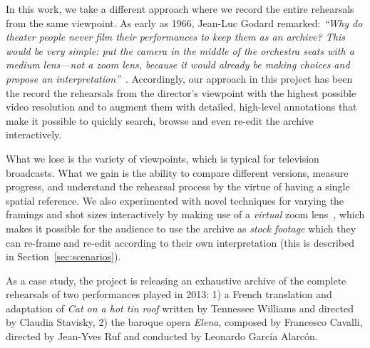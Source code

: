 \documentclass[conference]{IEEEtran}
\newcommand{\todo}[1]{\noindent\textcolor{red}{{\bf \{ToDo} #1{\bf \}}}}
\begin{document}
In this work, we take a different approach where we record the entire rehearsals from the same viewpoint.  As early as 1966, Jean-Luc Godard remarked: {\em ``Why do theater people never film their performances to keep  them as an archive? This would be very simple: put the camera in the middle of the orchestra seats with a medium lens---not a zoom lens, because it would already be making choices and propose an interpretation''}~\cite{Godard66}. Accordingly, our approach in this project has been the record the rehearsals from the director's viewpoint  with the highest possible video resolution and to augment them with detailed, high-level  annotations that make it possible to quickly  search, browse and even re-edit the archive interactively. 




What we lose is the variety of viewpoints, which is typical for television broadcasts. What we gain is the ability to compare different versions, measure progress, and understand the rehearsal process by the virtue of having a single spatial reference.
We also experimented with novel techniques for varying the framings and shot sizes interactively 
by making use of a {\em virtual}  zoom lens~\cite{Gandhi14,Gandhi15}, which makes it possible for the audience to use the archive as {\em stock footage} which they can re-frame and re-edit according to their own interpretation (this is described in Section~\ref{sec:scenarios}). 



As a case study, the project is releasing an exhaustive archive of the complete rehearsals of two performances played in 2013: 1) a French translation and adaptation of \emph{Cat on a hot tin roof} written by Tennessee Williams and directed by Claudia Stavisky, 2) the baroque opera \emph{Elena}, composed by Francesco Cavalli, directed by Jean-Yves Ruf and conducted by Leonardo García Alarcón.


\end{document}
